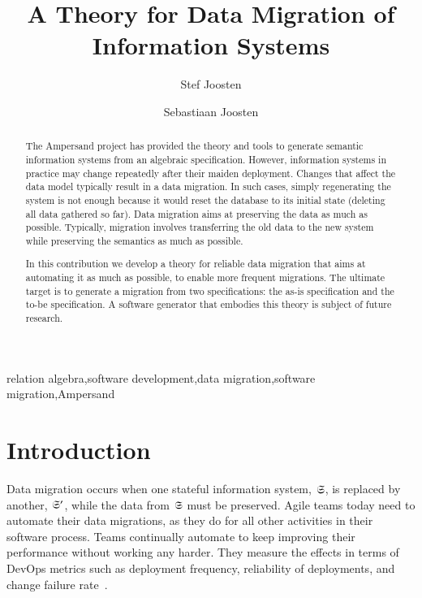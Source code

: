 \documentclass{elsarticle}
\begin{document}


\title{A Theory for Data Migration of Information Systems}
\author[ou,ordina]{Stef Joosten}
\author[umn]{Sebastiaan Joosten}
\address[ou]{Open Universiteit Nederland, Heerlen, the Netherlands}
\address[ordina]{Ordina NV, Nieuwegein, the Netherlands}
\address[umn]{University of Minnesota, Minneapolis, USA}

\begin{abstract}
	The Ampersand project has provided the theory and tools to generate semantic information systems from an algebraic specification.
	However, information systems in practice may change repeatedly after their maiden deployment.
	Changes that affect the data model typically result in a data migration.
	In such cases, simply regenerating the system is not enough because it would reset the database to its initial state (deleting all data gathered so far).
	Data migration aims at preserving the data as much as possible.
	Typically, migration involves transferring the old data to the new system while preserving the semantics as much as possible.

	In this contribution we develop a theory for reliable data migration that aims at automating it as much as possible,
	to enable more frequent migrations.
	The ultimate target is to generate a migration from two specifications: the as-is specification and the to-be specification.
	A software generator that embodies this theory is subject of future research.
\end{abstract}

\begin{keyword}
relation algebra\sep software development\sep data migration\sep software migration\sep Ampersand
\end{keyword}
\maketitle

\section{Introduction}
\label{sct:Introduction}
	Data migration occurs when one stateful information system, $\mathfrak{S}$, is replaced by another, $\mathfrak{S}'$,
	while the data from $\mathfrak{S}$ must be preserved.
	Agile teams today need to automate their data migrations, 
	as they do for all other activities in their software process.
	Teams continually automate to keep improving their performance without working any harder.
	They measure the effects in terms of DevOps metrics such as
	deployment frequency,
	reliability of deployments, and
	change failure rate~\cite{DevOps2021}.
\end{document}
